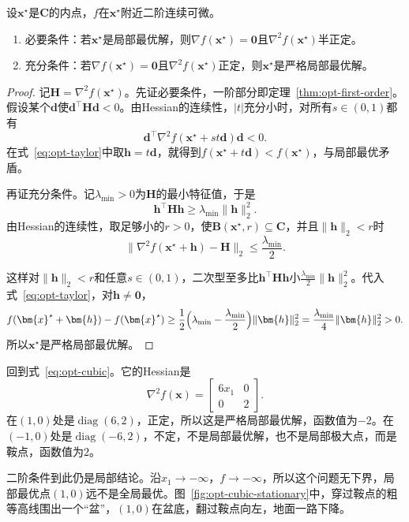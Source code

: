 \begin{theorem}[二阶条件]
\label{thm:opt-second-order}
设$\bm{x}^\star$是$\bm{C}$的内点，$f$在$\bm{x}^\star$附近二阶连续可微。
\begin{enumerate}
 \item 必要条件：若$\bm{x}^\star$是局部最优解，则$\nabla f(\bm{x}^\star)=\bm{0}$且$\nabla^2f(\bm{x}^\star)$半正定。
 \item 充分条件：若$\nabla f(\bm{x}^\star)=\bm{0}$且$\nabla^2f(\bm{x}^\star)$正定，则$\bm{x}^\star$是严格局部最优解。
\end{enumerate}
\end{theorem}

\begin{proof}
记$\bm{H}=\nabla^2f(\bm{x}^\star)$。先证必要条件，一阶部分即定理~\ref{thm:opt-first-order}。假设某个$\bm{d}$使$\bm{d}^\top\bm{H}\bm{d}<0$。由Hessian的连续性，$\lvert t\rvert$充分小时，对所有$s\in(0,1)$都有
\[
 \bm{d}^\top\nabla^2f(\bm{x}^\star+st\bm{d})\bm{d}<0.
\]
在式~\eqref{eq:opt-taylor}中取$\bm{h}=t\bm{d}$，就得到$f(\bm{x}^\star+t\bm{d})<f(\bm{x}^\star)$，与局部最优矛盾。

再证充分条件。记$\lambda_{\min}>0$为$\bm{H}$的最小特征值，于是
\[
 \bm{h}^\top\bm{H}\bm{h}\geq\lambda_{\min}\lVert\bm{h}\rVert_2^2.
\]
由Hessian的连续性，取足够小的$r>0$，使$\bm{B}(\bm{x}^\star,r)\subseteq\bm{C}$，并且$\lVert\bm{h}\rVert_2<r$时
\[
 \bigl\lVert\nabla^2f(\bm{x}^\star+\bm{h})-\bm{H}\bigr\rVert_2\leq\frac{\lambda_{\min}}{2}.
\]

这样对$\lVert\bm{h}\rVert_2<r$和任意$s\in(0,1)$，二次型至多比$\bm{h}^\top\bm{H}\bm{h}$小$\frac{\lambda_{\min}}{2}\lVert\bm{h}\rVert_2^2$。代入式~\eqref{eq:opt-taylor}，对$\bm{h}\neq\bm{0}$，
\[
 f(\bm{x}^\star+\bm{h})-f(\bm{x}^\star)\geq\frac12\Bigl(\lambda_{\min}-\frac{\lambda_{\min}}{2}\Bigr)\lVert\bm{h}\rVert_2^2=\frac{\lambda_{\min}}{4}\lVert\bm{h}\rVert_2^2>0.
\]
所以$\bm{x}^\star$是严格局部最优解。
\end{proof}

回到式~\eqref{eq:opt-cubic}。它的Hessian是
\[
 \nabla^2f(\bm{x})=\begin{bmatrix}6x_1&0\\0&2\end{bmatrix}.
\]
在$(1,0)$处是$\operatorname{diag}(6,2)$，正定，所以这是严格局部最优解，函数值为$-2$。在$(-1,0)$处是$\operatorname{diag}(-6,2)$，不定，不是局部最优解，也不是局部极大点，而是鞍点，函数值为$2$。

二阶条件到此仍是局部结论。沿$x_1\to-\infty$，$f\to-\infty$，所以这个问题无下界，局部最优点$(1,0)$远不是全局最优。图~\ref{fig:opt-cubic-stationary}中，穿过鞍点的粗等高线围出一个“盆”，$(1,0)$在盆底，翻过鞍点向左，地面一路下降。

